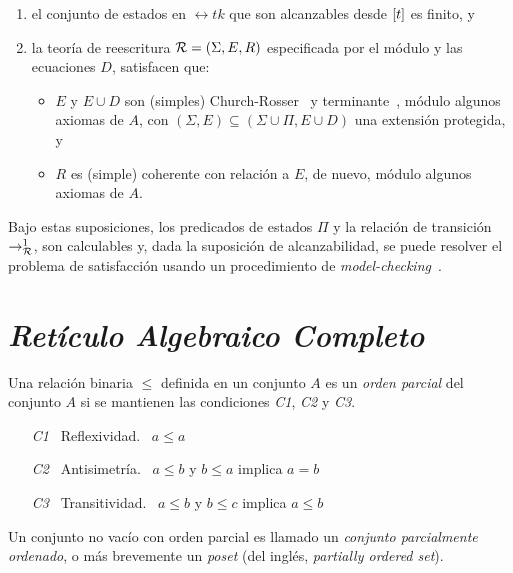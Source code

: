 \begin{enumerate}
   \item el conjunto de estados en $\rel{t}{k}$ que son alcanzables desde
	$[t]$ es finito, y

   \item la teor\'ia de reescritura $\mathcal{R} = (\Sigma,E,R)$ especificada
	por el m\'odulo  y las ecuaciones $D$, satisfacen que:
	\begin{itemize}
	   \item $E$ y $E \cup D$ son (simples) Church-Rosser~\cite{DBLP:journals/jlp/DuranM12}
		y terminante~\cite{Lucas2009207}, m\'odulo algunos axiomas
		de $A$, con $(\Sigma,E) \subseteq (\Sigma \cup \Pi, E \cup D)$
		una extensi\'on protegida, y

	   \item $R$ es (simple) coherente con relaci\'on a $E$, de nuevo,
		m\'odulo algunos axiomas de $A$.
	\end{itemize}
\end{enumerate}

Bajo estas suposiciones, los predicados de estados $\Pi$ y la relaci\'on de 
transici\'on $\rightarrow_{\mathcal{R}}^{1}$, son calculables y, dada la suposici\'on de
alcanzabilidad, se puede resolver el problema de satisfacci\'on usando un
procedimiento de {\em model-checking}~\cite{clarke-book}.

\section{{\em Ret\'iculo Algebraico Completo}}
\label{rac.prelim}

Una relaci\'on binaria $\leq$ definida en un conjunto $A$ es un \textit{orden parcial} del 
conjunto $A$ si se mantienen las condiciones \textit{C1}, \textit{C2} y \textit{C3}.

\begin{enumerate}  
	\item [\it{C1}] \ Reflexividad. \ $a \leq a$
	\item [\it{C2}] \ Antisimetr\'ia. \ $a \leq b$ y $b \leq a$ implica $a = b$
	\item [\it{C3}] \ Transitividad. \ $a \leq b$ y $b \leq c$ implica $a \leq b$
\end{enumerate}

Un conjunto no vac\'io con orden parcial es llamado un \textit{conjunto parcialmente 
ordenado}, o m\'as brevemente un \textit{poset} (del ingl\'es, \textit{partially ordered set}).

